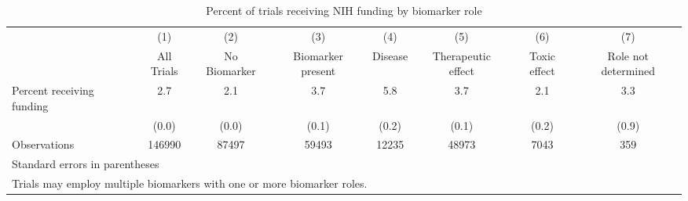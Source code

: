 \begin{table}[htbp]\centering
\caption{Percent of trials receiving NIH funding by biomarker role}
\begin{tabular}{l*{7}{c}}
\hline\hline
                &\multicolumn{1}{c}{(1)}&\multicolumn{1}{c}{(2)}&\multicolumn{1}{c}{(3)}&\multicolumn{1}{c}{(4)}&\multicolumn{1}{c}{(5)}&\multicolumn{1}{c}{(6)}&\multicolumn{1}{c}{(7)}\\
                &\multicolumn{1}{c}{All Trials}&\multicolumn{1}{c}{No Biomarker}&\multicolumn{1}{c}{Biomarker present}&\multicolumn{1}{c}{Disease}&\multicolumn{1}{c}{Therapeutic effect}&\multicolumn{1}{c}{Toxic effect}&\multicolumn{1}{c}{Role not determined}\\
\hline
Percent receiving funding&      2.7&      2.1&      3.7&      5.8&      3.7&      2.1&      3.3\\
                &    (0.0)&    (0.0)&    (0.1)&    (0.2)&    (0.1)&    (0.2)&    (0.9)\\
\hline
Observations    &   146990&    87497&    59493&    12235&    48973&     7043&      359\\
\hline\hline
\multicolumn{8}{l}{\footnotesize Standard errors in parentheses}\\
\multicolumn{8}{l}{\footnotesize Trials may employ multiple biomarkers with one or more biomarker roles.}\\
\end{tabular}
\end{table}

